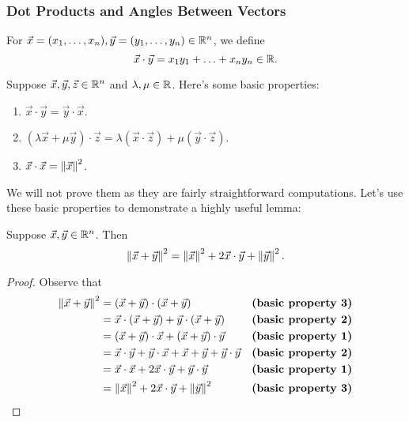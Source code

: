 \documentclass[main.tex]{subfiles}
\begin{document}
\subsubsection{Dot Products and Angles Between Vectors}

\begin{definition}
    For $\vec{x} = (x_1, \ldots , x_n), \vec{y} = (y_1, \ldots , y_n)\in \mathbb R^n$, we define
    \[\vec{x}\cdot \vec{y} = x_1y_1 + \ldots + x_ny_n\in \mathbb R.\]
\end{definition}

Suppose $\vec{x}, \vec{y}, \vec{z}\in \mathbb R^n$ and $\lambda, \mu\in \mathbb R$. Here's some basic properties:
\begin{enumerate}
    \item $\vec{x}\cdot\vec{y} = \vec{y}\cdot\vec{x}$.
    \item $(\lambda\vec{x} + \mu\vec{y})\cdot \vec{z} = \lambda (\vec{x}\cdot \vec{z}) + \mu (\vec{y}\cdot \vec{z})$.
    \item $\vec{x}\cdot \vec{x} = \left\lVert \vec{x} \right\rVert^2$.
\end{enumerate}

We will not prove them as they are fairly straightforward computations. Let's use these basic properties to demonstrate a highly useful lemma:

\begin{lemma}
    Suppose $\vec{x}, \vec{y}\in \mathbb R^n$. Then
    \[\left\lVert \vec{x} + \vec{y} \right\rVert^2 = \left\lVert \vec{x} \right\rVert^2 + 2\vec{x}\cdot \vec{y} + \left\lVert \vec{y} \right\rVert^2.\]
\end{lemma}
\begin{proof}
    Observe that
    \begin{align*}
    \left\lVert \vec{x} + \vec{y} \right\rVert^2 &= (\vec{x} + \vec{y})\cdot (\vec{x} + \vec{y}) && \textbf{(basic property 3)}\\
    &= \vec{x} \cdot (\vec{x} + \vec{y}) + \vec{y} \cdot (\vec{x} + \vec{y}) && \textbf{(basic property 2)}\\
    &= (\vec{x} + \vec{y})\cdot \vec{x} + (\vec{x} + \vec{y})\cdot \vec{y} && \textbf{(basic property 1)} \\
    &= \vec{x} \cdot \vec{y} + \vec{y}\cdot \vec{x} + \vec{x} + \vec{y} + \vec{y} \cdot \vec{y} && \textbf{(basic property 2)} \\
    &= \vec{x} \cdot \vec{x} + 2\vec{x}\cdot \vec{y} + \vec{y}\cdot \vec{y} && \textbf{(basic property 1)} \\
    &= \left\lVert \vec{x} \right\rVert^2 + 2\vec{x}\cdot \vec{y} + \left\lVert \vec{y} \right\rVert^2 && \textbf{(basic property 3)}
    \end{align*}
\end{proof}
\end{document}
